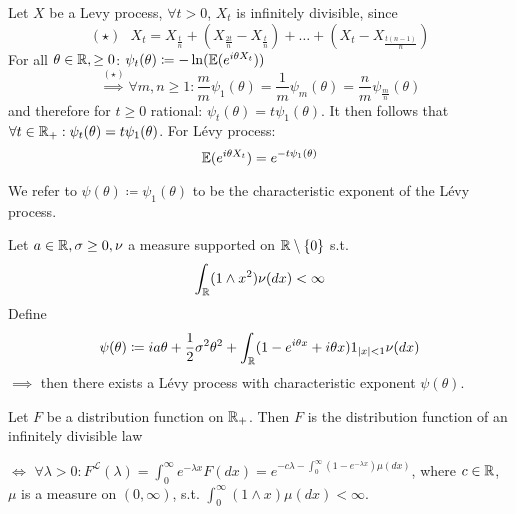 Let $X$ be a Levy process, $\forall t>0$, $X_t$ is infinitely divisible, since 
\[(\star) \text{ }X_{t}=X_{\frac{t}{n}}+\left(X_{\frac{2t}{n}}-X_{\frac{t}{n}}\right)+\dots+\left(X_{t}-X_{\frac{t(n-1)}{n}}\right)\]
For all $\theta\in\mathbb{R},\geq 0$: $\psi_t(\theta)\coloneqq -\ln(\mathbb{E}(e^{i\theta X_t}))$
\[\stackrel{(\star)}{\implies}\forall m,n\geq 1: \frac{m}{m}\psi_1(\theta)=\frac{1}{m}\psi_m(\theta)=\frac{n}{m}\psi_{\frac{m}{n}}(\theta)\]
and therefore for $t\geq 0$ rational: $\psi_t(\theta)=t\psi_1(\theta)$.
It then follows that $\forall t\in\mathbb{R}_+: \psi_t(\theta)=t\psi_1(\theta)$.
For Lévy process:
\[\mathbb{E}(e^{i\theta X_t})=e^{-t\psi_1(\theta)}\]
\begin{definition}\label{def:4.3}
    We refer to $\psi(\theta)\coloneqq \psi_1(\theta)$ to be the characteristic exponent of the Lévy process.
\end{definition}

\begin{theorem}\label{thm:4.4}
    Let $a\in\mathbb{R},\sigma\geq 0,\nu$ a measure supported on $\mathbb{R}\setminus\{0\}$ s.t. \[\int_{\mathbb{R}} (1\land x^2)\nu(dx)<\infty\]
    Define \[\psi(\theta)\coloneqq ia\theta+\frac{1}{2}\sigma^2\theta^2+\int_{\mathbb{R}} (1-e^{i\theta x}+i\theta x)1_{|x|<1}\nu(dx)\]
    $\implies$ then there exists a Lévy process with characteristic exponent $\psi(\theta)$.
\end{theorem}

\begin{proposition}\label{Prop:4.5}
    Let $F$ be a distribution function on $\mathbb{R}_+$. Then $F$ is the distribution function of an infinitely 
    divisible law
    
    $\iff$ $\forall\lambda >0: F^\mathcal{L}(\lambda)=\int_0^\infty e^{-\lambda x}F(dx)=e^{-c\lambda-\int_0^\infty (1-e^{-\lambda x})\mu(dx)}$,
    where $c\in\mathbb{R}$, $\mu$ is a measure on $(0,\infty)$, s.t. $\int_0^\infty (1\land x)\mu(dx)<\infty$. 
\end{proposition}


